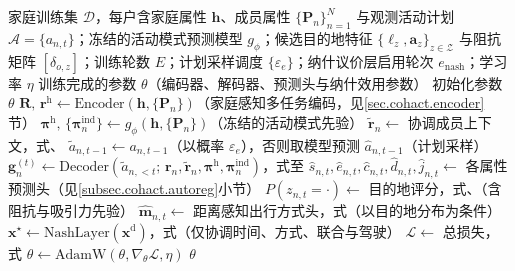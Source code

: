 \begin{algorithm}[H]
\caption{CoHACT 模型训练流程}\label{alg.cohact.training}
\begin{algorithmic}[1]
\REQUIRE 家庭训练集 $\mathcal{D}$，每户含家庭属性 $\mathbf{h}$、成员属性 $\{\mathbf{P}_n\}_{n=1}^{N}$ 与观测活动计划 $\mathcal{A}=\{a_{n,t}\}$；冻结的活动模式预测模型 $g_\phi$；候选目的地特征 $\{\boldsymbol{\ell}_z,\mathbf{a}_z\}_{z\in\mathcal{Z}}$ 与阻抗矩阵 $[\delta_{o,z}]$；训练轮数 $E$；计划采样调度 $\{\varepsilon_e\}$；纳什议价层启用轮次 $e_{\mathrm{nash}}$；学习率 $\eta$
\ENSURE 训练完成的参数 $\theta$（编码器、解码器、预测头与纳什效用参数）
\STATE 初始化参数 $\theta$
    \STATE $\mathbf{R},\,\mathbf{r}^{\mathrm{h}}\leftarrow\mathrm{Encoder}(\mathbf{h},\{\mathbf{P}_n\})$（家庭感知多任务编码，见\ref{sec.cohact.encoder}节）
    \STATE $\boldsymbol{\pi}^{\mathrm{h}},\,\{\boldsymbol{\pi}_n^{\mathrm{ind}}\}\leftarrow g_\phi(\mathbf{h},\{\mathbf{P}_n\})$（冻结的活动模式先验）
    \STATE $\tilde{\mathbf{r}}_n\leftarrow$ 协调成员上下文，式、
      \STATE $\tilde{a}_{n,t-1}\leftarrow a_{n,t-1}$（以概率 $\varepsilon_e$），否则取模型预测 $\hat{a}_{n,t-1}$（计划采样）
      \STATE $\mathbf{g}_n^{(t)}\leftarrow\mathrm{Decoder}(\tilde{a}_{n,<t};\,\mathbf{r}_n,\tilde{\mathbf{r}}_n,\boldsymbol{\pi}^{\mathrm{h}},\boldsymbol{\pi}_n^{\mathrm{ind}})$，式至
      \STATE $\hat{s}_{n,t},\hat{e}_{n,t},\hat{c}_{n,t},\hat{d}_{n,t},\hat{j}_{n,t}\leftarrow$ 各属性预测头（见\ref{subsec.cohact.autoreg}小节）
      \STATE $P(z_{n,t}=\cdot)\leftarrow$ 目的地评分，式、（含阻抗与吸引力先验）
      \STATE $\hat{\mathbf{m}}_{n,t}\leftarrow$ 距离感知出行方式头，式（以目的地分布为条件）
    \ENDFOR
      \STATE $\mathbf{x}^{\star}\leftarrow\mathrm{NashLayer}(\mathbf{x}^{\mathrm{d}})$，式（仅协调时间、方式、联合与驾驶）
    \ENDIF
    \STATE $\mathcal{L}\leftarrow$ 总损失，式
    \STATE $\theta\leftarrow\mathrm{AdamW}(\theta,\nabla_\theta\mathcal{L},\eta)$
  \ENDFOR
\ENDFOR
\RETURN $\theta$
\end{algorithmic}
\end{algorithm}

